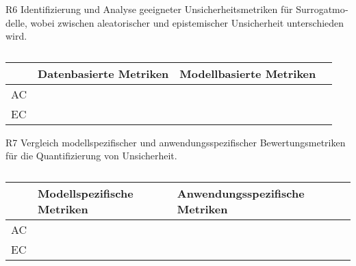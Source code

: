 \begin{otherlanguage}{ngerman}

R6 Identifizierung und Analyse geeigneter Unsicherheitsmetriken für Surrogatmodelle, wobei zwischen aleatorischer und epistemischer Unsicherheit unterschieden wird.

\begin{table}[htpb]
  \centering
  \begin{tabular}{|l|l|l|l|}  %
    \hline
    & \textbf{Datenbasierte Metriken} & \textbf{Modellbasierte Metriken} \\
    \hline
    AC & & \\
    \hline
    EC & & \\
    \hline
  \end{tabular}
  \caption{}\label{tab:chapter6r61}
\end{table}




R7 Vergleich modellspezifischer und anwendungsspezifischer Bewertungsmetriken für die Quantifizierung von Unsicherheit.



\begin{table}[htpb]
  \centering
  \begin{tabular}{|l|l|l|l|}  %
    \hline
    & \textbf{Modellspezifische Metriken} & \textbf{Anwendungsspezifische Metriken} \\
    \hline
    AC & & \\
    \hline
    EC & & \\
    \hline
  \end{tabular}
  \caption{}\label{tab:chapter6r71}
\end{table}




\end{otherlanguage}
